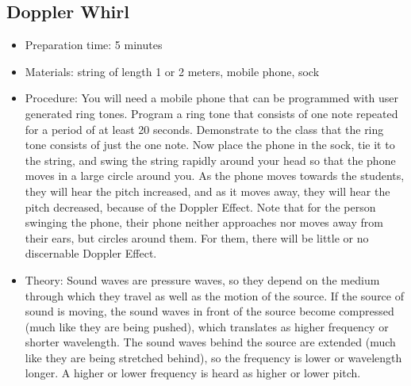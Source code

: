 \subsection{Doppler Whirl}
\begin{itemize}
\item{Preparation time: 5 minutes}
\item{Materials: string of length 1 or 2 meters, mobile phone, sock}
\item{Procedure: You will need a mobile phone that can be programmed with user generated ring tones. Program a ring tone that consists of one note repeated for a period of at least 20 seconds. Demonstrate to the class that the ring tone consists of just the one note. Now place the phone in the sock, tie it to the string, and swing the string rapidly around your head so that the phone moves in a large circle around you. As the phone moves towards the students, they will hear the pitch increased, and as it moves away, they will hear the pitch decreased, because of the Doppler Effect. Note that for the person swinging the phone, their phone neither approaches nor moves away from their ears, but circles around them. For them, there will be little or no discernable Doppler Effect.}
\item{Theory: Sound waves are pressure waves, so they depend on the medium through which they travel as well as the motion of the source. If the source of sound is moving, the sound waves in front of the source become compressed (much like they are being pushed), which translates as higher frequency or shorter wavelength. The sound waves behind the source are extended (much like they are being stretched behind), so the frequency is lower or wavelength longer. A higher or lower frequency is heard as higher or lower pitch.}
\end{itemize}



	
